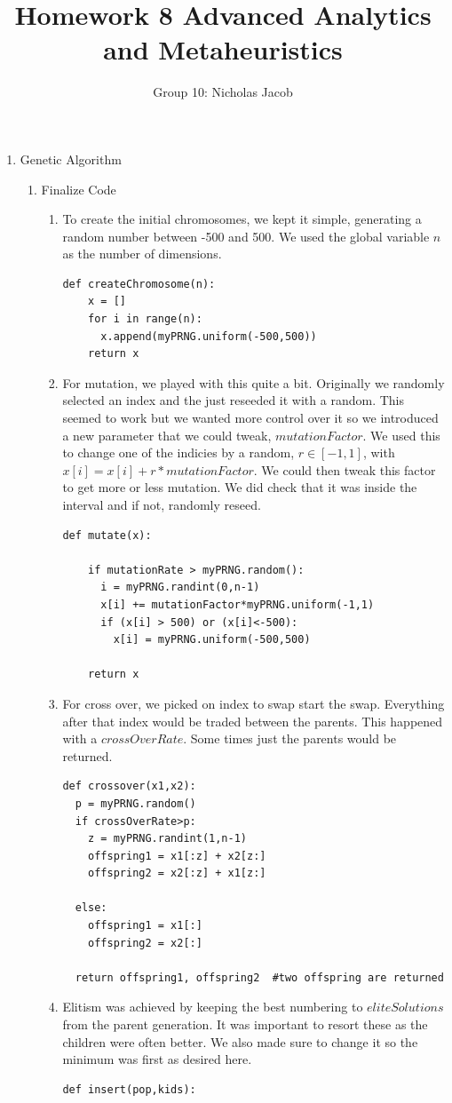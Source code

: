 \documentclass[11pt]{article}
\author{Group 10: Nicholas Jacob}
\title{Homework 8 Advanced Analytics and Metaheuristics}
\begin{document}
\maketitle

\begin{enumerate}
\item Genetic Algorithm
\begin{enumerate}
\item Finalize Code
\begin{enumerate}
\item To create the initial chromosomes, we kept it simple, generating a random number between -500 and 500.  We used the global variable $n$ as the number of dimensions.
\begin{verbatim}
def createChromosome(n):
    x = []   
    for i in range(n):
      x.append(myPRNG.uniform(-500,500))
    return x
\end{verbatim}
\item For mutation, we played with this quite a bit.  Originally we randomly selected an index and the just reseeded it with a random.  This seemed to work but we wanted more control over it so we introduced a new parameter that we could tweak, $mutationFactor$.  We used this to change one of the indicies by a random, $r\in[-1,1]$, with $x[i] = x[i] +r*mutationFactor$.  We could then tweak this factor to get more or less mutation.  We did check that it was inside the interval and if not, randomly reseed.
\begin{verbatim}
def mutate(x):

    if mutationRate > myPRNG.random():
      i = myPRNG.randint(0,n-1)
      x[i] += mutationFactor*myPRNG.uniform(-1,1)
      if (x[i] > 500) or (x[i]<-500):
        x[i] = myPRNG.uniform(-500,500)

    return x
\end{verbatim} 

\item For cross over, we picked on index to swap start the swap.  Everything after that index would be traded between the parents.  This happened with a $crossOverRate$.  Some times just the parents would be returned.
\begin{verbatim}
def crossover(x1,x2):
  p = myPRNG.random()
  if crossOverRate>p:
    z = myPRNG.randint(1,n-1)
    offspring1 = x1[:z] + x2[z:]
    offspring2 = x2[:z] + x1[z:]

  else:
    offspring1 = x1[:]
    offspring2 = x2[:]

  return offspring1, offspring2  #two offspring are returned
\end{verbatim}
\item Elitism was achieved by keeping the best numbering to $eliteSolutions$ from the parent generation.  It was important to resort these as the children were often better.  We also made sure to change it so the minimum was first as desired here.
\begin{verbatim}
def insert(pop,kids):


\end{verbatim}
\end{enumerate}
\end{enumerate}
\end{enumerate}
\end{document}
